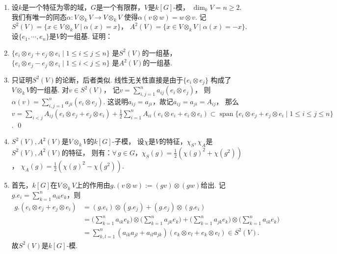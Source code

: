 \begin{enumerate}
\item[10.2] 设$k$是一个特征为零的域，$G$是一个有限群，$V$是$k[G]$-模，
    $\dim_{k}V = n \geq 2$. 
    我们有唯一的同态$\alpha:V \otimes_{k} V \rightarrow V \otimes_{k} V$
    使得$\alpha(v \otimes w) = w \otimes v$. 
    记$S^{2}(V)=\{x \in V \otimes_{k} V \mid \alpha(x)=x\}$，
    $A^{2}(V)=\{x \in V \otimes_{k} V \mid \alpha(x)=-x\}$.
    设$\{e_{1},\cdots,e_{n}\}$是$V$的一组基. 证明：
    \item[(i)] $\{e_{i} \otimes e_{j} + e_{j} \otimes e_{i} \mid 1 \leq i \leq j \leq n\}$
        是$S^{2}(V)$的一组基，
        $\{e_{i} \otimes e_{j} - e_{j} \otimes e_{i} \mid 1 \leq i < j \leq n\}$
        是$A^{2}(V)$的一组基.
    \item[\textbf{证明:}]
        只证明$S^{2}(V)$的论断，后者类似. 
        线性无关性直接是由于$\{e_{i} \otimes e_{j}\}$
        构成了$V \otimes_{k} V$的一组基. 对$v \in S^{2}(V)$，
        记$v = \sum_{i,j=1}^{n}a_{ij}(e_{i} \otimes e_{j})$，
        则$\alpha(v) = \sum_{i,j=1}^{n}a_{ji}(e_{i} \otimes e_{j})$.
        这说明$a_{ij}=a_{ji}$，故记$a_{ij}=a_{ji}=A_{ij}$，
        那么$v=\sum_{i<j}A_{ij}(e_{i} \otimes e_{j} + e_{j} \otimes e_{i})
        + \frac{1}{2}\sum_{i=1}^{n}
        A_{ii}(e_{i} \otimes e_{i} + e_{i} \otimes e_{i})
        \subset \operatorname{span}
        \{e_{i} \otimes e_{j} + e_{j} \otimes e_{i} 
        \mid 1 \leq i \leq j \leq n\}$. \qed
    \item[(ii)] $S^{2}(V),A^{2}(V)$是$V \otimes_{k} V$的$k[G]$-子模，
        设$\chi$是$V$的特征，$\chi_{S},\chi_{A}$是$S^{2}(V),A^{2}(V)$的特征，
        则有：$\forall \, g \in G$，$\chi_{S}(g)=\frac{1}{2}(\chi(g)^{2}+\chi(g^{2}))$，
        $\chi_{A}(g)=\frac{1}{2}(\chi(g)^{2}-\chi(g^{2}))$.
    \item[\textbf{证明:}]
        首先，$k[G]$在$V \otimes_{k} V$上的作用由$g.(v \otimes w):=(gv) \otimes (gw)$给出.
        记$g.e_{i}=\sum_{k=1}^{n}a_{ik}e_{k}$，则
        \begin{equation*}\begin{aligned}
            g.(e_{i} \otimes e_{j} + e_{j} \otimes e_{i}) 
            &= (g.e_{i}) \otimes (g.e_{j}) + (g.e_{j}) \otimes (g.e_{i}) \\
            &= \bigg(\sum_{k=1}^{n}a_{ik}e_{k}\bigg) \otimes \bigg(\sum_{k=1}^{n}a_{jk}e_{k}\bigg)
            +  \bigg(\sum_{k=1}^{n}a_{jk}e_{k}\bigg) \otimes \bigg(\sum_{k=1}^{n}a_{ik}e_{k}\bigg) \\
            &= \sum_{k,l=1}^{n}(a_{ik}a_{jl}+a_{il}a_{jk})
            (e_{k} \otimes e_{l} + e_{k} \otimes e_{l}) \in S^{2}(V).
        \end{aligned}\end{equation*}
        故$S^{2}(V)$是$k[G]$-模. 


\end{enumerate}
